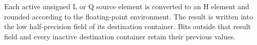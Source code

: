 Each active unsigned L or Q source element is converted to an H element and
rounded according to the floating-point environment. The result is written
into the low half-precision field of its destination container. Bits outside
that result field and every inactive destination container retain their
previous values.

